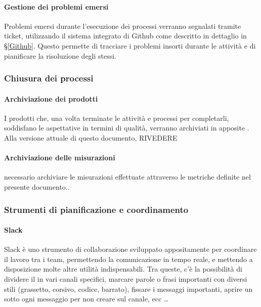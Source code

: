     		\paragraph{Gestione dei problemi emersi}
			Problemi emersi durante l'esecuzione dei processi verranno segnalati tramite ticket, utilizzando il sistema integrato di Github come descritto
			in dettaglio in \S\ref{Github}. Questo permette di tracciare i problemi insorti durante le attività e di pianificare la risoluzione degli stessi.


		\subsubsection{Chiusura dei processi}

    		\paragraph{Archiviazione dei prodotti} %
			I prodotti che, una volta terminate le attività e processi per completarli, soddisfano le aspettative in termini di qualità,
			verranno archiviati in apposite . Alla versione attuale di questo documento, RIVEDERE

    		\paragraph{Archiviazione delle misurazioni} %
    		necessario archiviare le misurazioni effettuate attraverso le metriche definite nel presente documento..

    	\subsubsection{Strumenti di pianificazione e coordinamento}\label{pianificazione e coordinamento}

    		\paragraph{Slack}
			Slack è uno strumento di collaborazione sviluppato appositamente per coordinare il lavoro tra i team, permettendo la comunicazione in tempo
			reale, e mettendo a disposizione molte altre utilità indispensabili. Tra queste, c'è la possibilità di dividere il  in vari canali
			specifici, marcare parole o frasi importanti con diversi stili (grassetto, corsivo, codice, barrato), fissare i messaggi importanti, aprire un 
			sotto ogni messaggio per non creare  sul canale, ecc \dots

